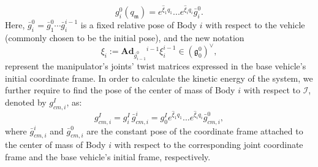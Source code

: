 \documentclass[lettersize,journal]{IEEEtran}
\def \Ad {\textbf{Ad}}
\theoremstyle{remark}
\begin{document}
\begin{equation}
    g^0_i(q_\mathfrak{m})=e^{\hat{\xi}_{1}q_{1}}...e^{\hat{\xi}_{i}q_{i}}\bar{g}^0_{i}.
\end{equation}
Here, $\bar{g}^0_i=\bar{g}^0_1\cdots \bar{g}^{i-1}_i$ is a fixed relative pose of Body $i$ with respect to the vehicle (commonly chosen to be the initial pose), and the new notation
\begin{equation}
  {\xi}_i:= \Ad_{\bar{g}^0_{i-1}}{}^{i-1}{\xi}^{i-1}_i\in(\mathfrak{g}_0^0)^\vee, \label{twist}
\end{equation}
represent the manipulator's joints' twist matrices expressed in the base vehicle's initial coordinate frame. %
In order to calculate the kinetic energy of the system, we further require to find the pose of the center of mass of Body $i$ with respect to $\mathcal{I}$, denoted by $g^I_{cm,i}$, as:
\begin{equation}
    g^I_{cm,i}=g^I_i\,\bar{g}^i_{cm,i}=g^I_0e^{\hat{\xi}_{1}q_{1}}...e^{\hat{\xi}_{i}q_{i}}\bar{g}^0_{cm,i},
\end{equation}
where $\bar{g}^i_{cm,i}$ and $\bar{g}^0_{cm,i}$ are the constant pose of the coordinate frame attached to the center of mass of Body $i$ with respect to the corresponding joint coordinate frame and the base vehicle's initial frame, respectively.
\end{document}
